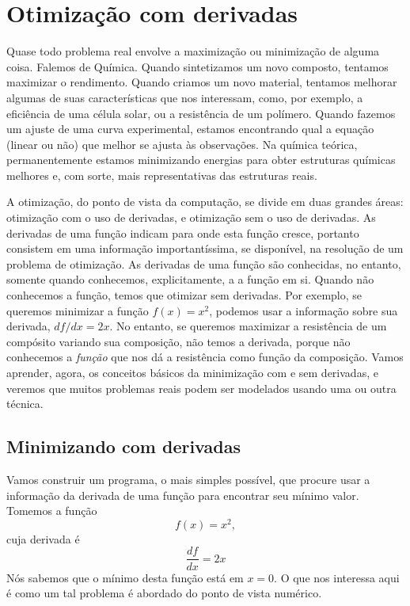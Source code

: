 \documentclass[10pt,a4paper,ssfamily]{exam}
\begin{document}
\newpage
\section{Otimização com derivadas}

Quase todo problema real envolve a maximização ou minimização de alguma
coisa. Falemos de Química. Quando sintetizamos um novo composto,
tentamos maximizar o rendimento. Quando criamos um novo material,
tentamos melhorar algumas de suas características que nos interessam,
como, por exemplo, a eficiência de uma célula solar, ou a resistência de
um polímero. Quando fazemos um ajuste de uma curva experimental, estamos
encontrando qual a equação (linear ou não) que melhor se ajusta às
observações. Na química teórica, permanentemente estamos minimizando
energias para obter estruturas químicas melhores e, com sorte, mais
representativas das estruturas reais.     

A otimização, do ponto de vista da computação, se divide em duas grandes
áreas: otimização com o uso de derivadas, e otimização sem o uso de
derivadas. As derivadas de uma função indicam para onde esta função
cresce, portanto consistem em uma informação importantíssima, se
disponível, na resolução de um problema de otimização. As derivadas de
uma função são conhecidas, no entanto, somente quando conhecemos,
explicitamente, a a função em si. Quando não conhecemos a função, temos
que otimizar sem derivadas. Por exemplo, se queremos minimizar a função
$f(x)=x^2$, podemos usar a informação sobre sua derivada, $df/dx=2x$. No
entanto, se queremos maximizar a resistência de um compósito variando
sua composição, não temos a derivada, porque não conhecemos a {\it
função} que nos dá a resistência como função da composição. Vamos
aprender, agora, os conceitos básicos da minimização com e sem
derivadas, e veremos que muitos problemas reais podem ser modelados
usando uma ou outra técnica.  

\subsection{Minimizando com derivadas}

Vamos construir um programa, o mais simples possível, que procure usar a
informação da derivada de uma função para encontrar seu mínimo valor.
Tomemos a função
\[
f(x) = x^2,
\]
cuja derivada é
\[
\frac{df}{dx} = 2x
\]
Nós sabemos que o mínimo desta função está em $x=0$. O que nos interessa
aqui é como um tal problema é abordado do ponto de vista numérico.
\end{document}
